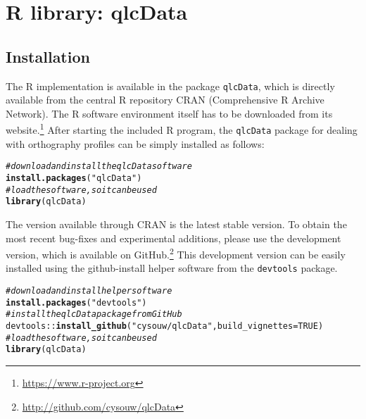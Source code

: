\documentclass[output=book,nonflat,modfonts,
colorlinks, citecolor=brown,
		]{langsci/langscibook}\usepackage[]{graphicx}\usepackage[]{color}
\makeatletter
\newcommand{\hlnum}[1]{\textcolor[rgb]{0.686,0.059,0.569}{#1}}%
\newcommand{\hlstr}[1]{\textcolor[rgb]{0.192,0.494,0.8}{#1}}%
\newcommand{\hlcom}[1]{\textcolor[rgb]{0.678,0.584,0.686}{\textit{#1}}}%
\newcommand{\hlopt}[1]{\textcolor[rgb]{0,0,0}{#1}}%
\newcommand{\hlstd}[1]{\textcolor[rgb]{0.345,0.345,0.345}{#1}}%
\newcommand{\hlkwc}[1]{\textcolor[rgb]{0.333,0.667,0.333}{#1}}%
\newcommand{\hlkwd}[1]{\textcolor[rgb]{0.737,0.353,0.396}{\textbf{#1}}}%
\newenvironment{kframe}{%
 \def\at@end@of@kframe{}%
 \ifinner\ifhmode%
  \def\at@end@of@kframe{\end{minipage}}%
  \begin{minipage}{\columnwidth}%
 \fi\fi%
 \def\FrameCommand##1{\hskip\@totalleftmargin \hskip-\fboxsep
 \colorbox{shadecolor}{##1}\hskip-\fboxsep
     \hskip-\linewidth \hskip-\@totalleftmargin \hskip\columnwidth}%
 \MakeFramed {\advance\hsize-\width
   \@totalleftmargin\z@ \linewidth\hsize
   \@setminipage}}%
 {\par\unskip\endMakeFramed%
 \at@end@of@kframe}
\newenvironment{knitrout}{}{} %
\makeatother
\begin{document}
\section{R library: qlcData}
\label{r-implementation}

\subsection*{Installation}

The R implementation is available in the package \texttt{qlcData}, which is 
directly available from the central R repository CRAN (Comprehensive R Archive 
Network). The R software environment itself has to be downloaded from its 
website.\footnote{\url{https://www.r-project.org}} After starting the included 
R program, the \texttt{qlcData} package for dealing with orthography profiles can be 
simply installed as follows:

\begin{knitrout}\footnotesize
{}\color{fgcolor}\begin{kframe}
\begin{alltt}
\hlcom{# download and install the qlcData software}
\hlkwd{install.packages}\hlstd{(}\hlstr{"qlcData"}\hlstd{)}
\hlcom{# load the software, so it can be used}
\hlkwd{library}\hlstd{(qlcData)}
\end{alltt}
\end{kframe}
\end{knitrout}

The version available through CRAN is the latest stable version.
To obtain the most recent bug-fixes and experimental additions, please use the
development version, which is available on
GitHub.\footnote{\url{http://github.com/cysouw/qlcData}} This development
version can be easily installed using the github-install helper software from the
\texttt{devtools} package.

\begin{knitrout}\footnotesize
{}\color{fgcolor}\begin{kframe}
\begin{alltt}
\hlcom{# download and install helper software}
\hlkwd{install.packages}\hlstd{(}\hlstr{"devtools"}\hlstd{)}
\hlcom{# install the qlcData package from GitHub}
\hlstd{devtools}\hlopt{::}\hlkwd{install_github}\hlstd{(}\hlstr{"cysouw/qlcData"}\hlstd{,} \hlkwc{build_vignettes} \hlstd{=} \hlnum{TRUE}\hlstd{)}
\hlcom{# load the software, so it can be used}
\hlkwd{library}\hlstd{(qlcData)}
\end{alltt}
\end{kframe}
\end{knitrout}
\end{document}
